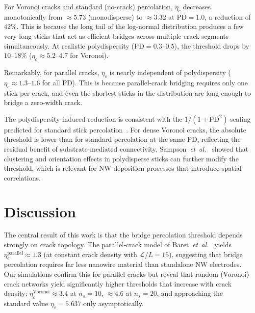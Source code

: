 For Voronoi cracks and standard (no-crack) percolation,
$\eta_c$ decreases monotonically from $\approx 5.73$ (monodisperse)
to $\approx 3.32$ at $\mathrm{PD} = 1.0$,
a reduction of $42\%$.
This is because the long tail of the log-normal distribution
produces a few very long sticks that act as efficient bridges
across multiple crack segments simultaneously.
At realistic polydispersity ($\mathrm{PD} = 0.3$--$0.5$),
the threshold drops by $10$--$18\%$
($\eta_c \approx 5.2$--$4.7$ for Voronoi).

Remarkably, for parallel cracks, $\eta_c$ is nearly
independent of polydispersity ($\eta_c \approx 1.3$--$1.6$
for all $\mathrm{PD}$).
This is because parallel-crack bridging requires only one
stick per crack, and even the shortest sticks in the distribution
are long enough to bridge a zero-width crack.

The polydispersity-induced reduction is consistent with the
$1/(1+\mathrm{PD}^2)$ scaling predicted for standard stick
percolation~\cite{Chatterjee2010,Mecke2002}.
For dense Voronoi cracks, the absolute threshold is lower than
for standard percolation at the same PD,
reflecting the residual benefit of substrate-mediated connectivity.
Sampson~\textit{et~al.}~\cite{Sampson2023} showed that clustering
and orientation effects in polydisperse sticks can further modify
the threshold, which is relevant for NW deposition processes
that introduce spatial correlations.

\section{Discussion}

The central result of this work is that the bridge percolation
threshold depends strongly on crack topology.
The parallel-crack model of Baret~\textit{et~al.}~\cite{Baret2024}
yields $\eta_c^\mathrm{parallel} \approx 1.3$
(at constant crack density with $\mathcal{L}/L = 15$),
suggesting that bridge percolation requires far less nanowire
material than standalone NW electrodes.
Our simulations confirm this for parallel cracks but reveal that
random (Voronoi) crack networks yield significantly higher
thresholds that increase with crack density:
$\eta_c^\mathrm{Voronoi} \approx 3.4$ at $n_s = 10$,
$\approx 4.6$ at $n_s = 20$, and approaching
the standard value $\eta_c = 5.637$ only asymptotically.

